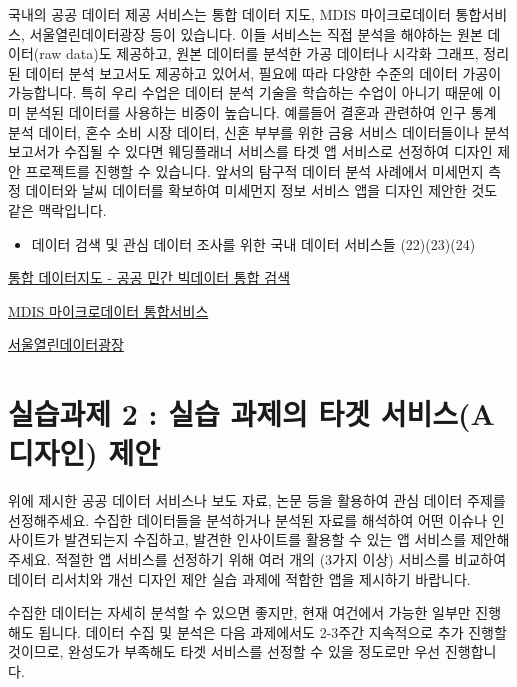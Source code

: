 \documentclass[
  letterpaper,
]{book}
\providecommand{\tightlist}{%
  \setlength{\itemsep}{0pt}\setlength{\parskip}{0pt}}\usepackage{longtable,booktabs,array}
\begin{document}
국내의 공공 데이터 제공 서비스는 통합 데이터 지도, MDIS 마이크로데이터
통합서비스, 서울열린데이터광장 등이 있습니다. 이들 서비스는 직접 분석을
해야하는 원본 데이터(raw data)도 제공하고, 원본 데이터를 분석한 가공
데이터나 시각화 그래프, 정리된 데이터 분석 보고서도 제공하고 있어서,
필요에 따라 다양한 수준의 데이터 가공이 가능합니다. 특히 우리 수업은
데이터 분석 기술을 학습하는 수업이 아니기 때문에 이미 분석된 데이터를
사용하는 비중이 높습니다. 예를들어 결혼과 관련하여 인구 통계 분석
데이터, 혼수 소비 시장 데이터, 신혼 부부를 위한 금융 서비스 데이터들이나
분석 보고서가 수집될 수 있다면 웨딩플래너 서비스를 타겟 앱 서비스로
선정하여 디자인 제안 프로젝트를 진행할 수 있습니다. 앞서의 탐구적 데이터
분석 사례에서 미세먼지 측정 데이터와 날씨 데이터를 확보하여 미세먼지
정보 서비스 앱을 디자인 제안한 것도 같은 맥락입니다.

\begin{itemize}
\tightlist
\item
  데이터 검색 및 관심 데이터 조사를 위한 국내 데이터 서비스들
  (22)(23)(24)
\end{itemize}

\href{https://www.bigdata-map.kr}{통합 데이터지도 - 공공 민간 빅데이터
통합 검색}

\href{https://mdis.kostat.go.kr/index.do}{MDIS 마이크로데이터
통합서비스}

\href{https://data.seoul.go.kr}{서울열린데이터광장}

\section{실습과제 2 : 실습 과제의 타겟 서비스(A 디자인)
제안}\label{uxc2e4uxc2b5uxacfcuxc81c-2-uxc2e4uxc2b5-uxacfcuxc81cuxc758-uxd0c0uxac9f-uxc11cuxbe44uxc2a4a-uxb514uxc790uxc778-uxc81cuxc548}

위에 제시한 공공 데이터 서비스나 보도 자료, 논문 등을 활용하여 관심
데이터 주제를 선정해주세요. 수집한 데이터들을 분석하거나 분석된 자료를
해석하여 어떤 이슈나 인사이트가 발견되는지 수집하고, 발견한 인사이트를
활용할 수 있는 앱 서비스를 제안해주세요. 적절한 앱 서비스를 선정하기
위해 여러 개의 (3가지 이상) 서비스를 비교하여 데이터 리서치와 개선
디자인 제안 실습 과제에 적합한 앱을 제시하기 바랍니다.

수집한 데이터는 자세히 분석할 수 있으면 좋지만, 현재 여건에서 가능한
일부만 진행해도 됩니다. 데이터 수집 및 분석은 다음 과제에서도 2-3주간
지속적으로 추가 진행할 것이므로, 완성도가 부족해도 타겟 서비스를 선정할
수 있을 정도로만 우선 진행합니다.
\end{document}
